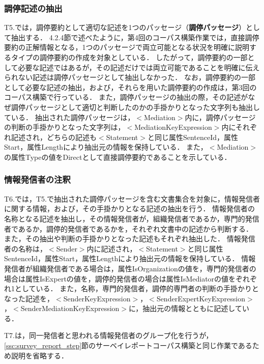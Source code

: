 \documentclass[japanese]{jnlp_1.4}
\begin{document}
\subsubsection{調停記述の抽出}

T5.では，調停要約として適切な記述を1つのパッセージ（{\bf 調停パッセージ}）として抽出する．
4.2.4節で述べたように，第4回のコーパス構築作業では，直接調停要約の正解情報となる，1つのパッセージで両立可能となる状況を明確に説明するタイプの調停要約の作成を対象としている．
したがって，調停要約の一部として必要な記述ではあるが，その記述だけでは両立可能であることを明確に伝えられない記述は調停パッセージとして抽出しなかった．
なお，調停要約の一部として必要な記述の抽出，および，それらを用いた調停要約の作成は，第3回のコーパス構築で行っている．
また，調停パッセージの抽出の際，その記述がなぜ調停パッセージとして適切と判断したのかの手掛かりとなった文字列も抽出している．
抽出された調停パッセージは，{\sf $<$Mediation$>$}内に，調停パッセージの判断の手掛かりとなった文字列は，{\sf $<$MediationKeyExpression$>$}内にそれぞれ記述され，どちらの記述も{\sf $<$Statement$>$}と同じ属性{\sf SentenceId}，属性{\sf Start}，属性{\sf Length}により抽出元の情報を保持している．
また，{\sf $<$Mediation$>$}の属性{\sf Type}の値を{\sf Direct}として直接調停要約であることを示している．


\subsubsection{情報発信者の注釈}

T6.では，T5.で抽出された調停パッセージを含む文書集合を対象に，情報発信者に関する情報，および，その手掛かりとなる記述の抽出を行う．
情報発信者の名称となる記述を抽出し，その情報発信者が，組織発信者であるか，専門的発信者であるか，調停的発信者であるかを，それぞれ文書中の記述から判断する．
また，その抽出や判断の手掛かりとなった記述もそれぞれ抽出した．
情報発信者の名称は，{\sf $<$Sender$>$}内に記述され，{\sf $<$Statement$>$}と同じ属性{\sf SentenceId}，属性{\sf Start}，属性{\sf Length}により抽出元の情報を保持している．
情報発信者が組織発信者である場合は，属性{\sf IsOrganization}の値を，専門的発信者の場合は属性{\sf IsExpert}の値を，調停的発信者の場合は属性{\sf IsMediator}の値をぞれぞれ1としている．
また，名称，専門的発信者，調停的専門者の判断の手掛かりとなった記述を，{\sf $<$SenderKeyExpression$>$}，{\sf $<$SenderExpe{rt}KeyExpression$>$}，{\sf $<$SenderMediationKeyExpression$>$}に，抽出元の情報とともに記述している．

T7.は，同一発信者と思われる情報発信者のグループ化を行うが，\ref{ssc:survey_report_step}節のサーベイレポートコーパス構築と同じ作業であるため説明を省略する．
\end{document}
